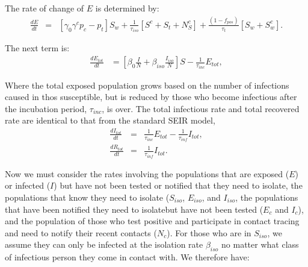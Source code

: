 \documentclass[notitlepage, superscriptaddress]{revtex4-2}
\begin{document}
The rate of change of $E$ is determined by:
\begin{eqnarray}
\label{E:dE}
\frac{dE}{dt} &=& [\gamma_{0}  \gamma^{c} p_{c} -p_{t}] S_{w} + \frac{1}{\tau_{iso}}[S^{c} + S_{t} + N^{c}_{S}] + \frac{(1-f_{pos})}{\tau_{t}}[S_{w} + S^{c}_{w}].
\end{eqnarray}


The next term is:
\begin{eqnarray}
\label{E:dEtot}
\frac{dE_{tot}}{dt} &= [\beta_0 \frac{I}{N} + \beta_{iso} \frac{I_{iso}}{N}] S - \frac{1}{\tau_{inc}}E_{tot}, 
\end{eqnarray}

Where the total exposed population grows based on the number of infections caused in thos susceptible, but is reduced by those who become infectious after the incubation period, $\tau_{inc}$, is over. The total infectious rate and total recovered rate are identical to that from the standard SEIR model,
\begin{eqnarray}
\label{E:dItot}
\frac{dI_{tot}}{dt} &=& \frac{1}{\tau_{inc}}E_{tot} - \frac{1}{\tau_{inf}}I_{tot}, \\
\frac{dR_{tot}}{dt} &=& \frac{1}{\tau_{inf}}I_{tot}.
\end{eqnarray}

Now we must consider the rates involving the populations that are exposed ($E$) or infected ($I$) but have not been tested or notified that they need to isolate, the populations that know they need to isolate ($S_{iso}$, $E_{iso}$, and $I_{iso}$, the populations that have been notified they need to isolatebut have not been tested ($E_{c}$ and $I_{c}$), and the population of those who test positive and participate in contact tracing and need to notify their recent contacts ($N_c$). For those who are in $S_{iso}$, we assume they can only be infected at the isolation rate $\beta_{iso}$ no matter what class of infectious person they come in contact with. We therefore have:
\end{document}
